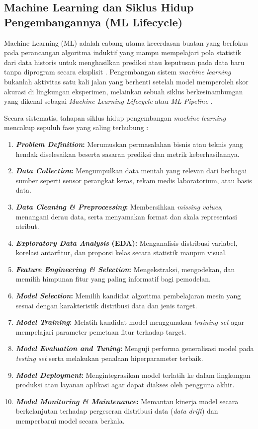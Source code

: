 \documentclass[a4paper,oneside,11pt]{book}
\begin{document}
\subsection{Machine Learning dan Siklus Hidup Pengembangannya (ML Lifecycle)}
\par Machine Learning (ML) adalah cabang utama kecerdasan buatan yang berfokus pada perancangan algoritma induktif yang mampu mempelajari pola statistik dari data historis untuk menghasilkan prediksi atau keputusan pada data baru tanpa diprogram secara eksplisit \cite{aws_ml, dqlab_ml}. Pengembangan sistem \textit{machine learning} bukanlah aktivitas satu kali jalan yang berhenti setelah model memperoleh skor akurasi di lingkungan eksperimen, melainkan sebuah siklus berkesinambungan yang dikenal sebagai \textit{Machine Learning Lifecycle} atau \textit{ML Pipeline} \cite{geeksforgeeks_ml_lifecycle, huyen2022designing}.
\par Secara sistematis, tahapan siklus hidup pengembangan \textit{machine learning} mencakup sepuluh fase yang saling terhubung \cite{geeksforgeeks_ml_lifecycle, kreuzberger2023mlops}:
\begin{enumerate}[label=\arabic*.]
  \item \textbf{\textit{Problem Definition}:} Merumuskan permasalahan bisnis atau teknis yang hendak diselesaikan beserta sasaran prediksi dan metrik keberhasilannya.
  \item \textbf{\textit{Data Collection}:} Mengumpulkan data mentah yang relevan dari berbagai sumber seperti sensor perangkat keras, rekam medis laboratorium, atau basis data.
  \item \textbf{\textit{Data Cleaning \& Preprocessing}:} Membersihkan \textit{missing values}, menangani derau data, serta menyamakan format dan skala representasi atribut.
  \item \textbf{\textit{Exploratory Data Analysis} (EDA):} Menganalisis distribusi variabel, korelasi antarfitur, dan proporsi kelas secara statistik maupun visual.
  \item \textbf{\textit{Feature Engineering \& Selection}:} Mengekstraksi, mengodekan, dan memilih himpunan fitur yang paling informatif bagi pemodelan.
  \item \textbf{\textit{Model Selection}:} Memilih kandidat algoritma pembelajaran mesin yang sesuai dengan karakteristik distribusi data dan jenis target.
  \item \textbf{\textit{Model Training}:} Melatih kandidat model menggunakan \textit{training set} agar mempelajari parameter pemetaan fitur terhadap target.
  \item \textbf{\textit{Model Evaluation and Tuning}:} Menguji performa generalisasi model pada \textit{testing set} serta melakukan penalaan hiperparameter terbaik.
  \item \textbf{\textit{Model Deployment}:} Mengintegrasikan model terlatih ke dalam lingkungan produksi atau layanan aplikasi agar dapat diakses oleh pengguna akhir.
  \item \textbf{\textit{Model Monitoring \& Maintenance}:} Memantau kinerja model secara berkelanjutan terhadap pergeseran distribusi data (\textit{data drift}) dan memperbarui model secara berkala.
\end{enumerate}
\end{document}
